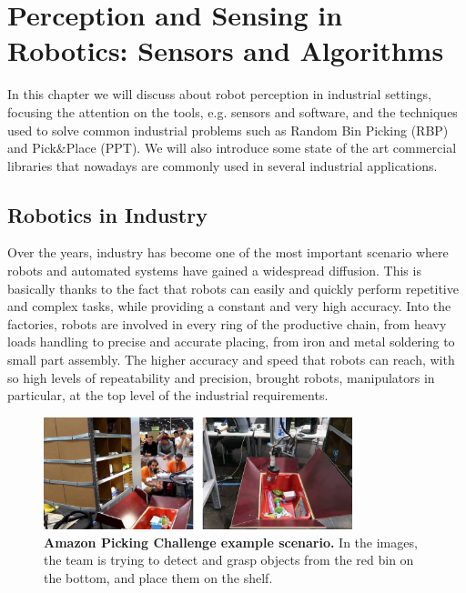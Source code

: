 \chapter{Perception and Sensing in Robotics: Sensors and Algorithms}\label{ch:perceptionandsensing}
In this chapter we will discuss about robot perception in industrial settings, focusing the attention on the tools, e.g. sensors and software, and the techniques used to solve common industrial problems such as Random Bin Picking (RBP) and Pick\&Place (PPT). We will also introduce some state of the art commercial libraries that nowadays are commonly used in several industrial applications.

\section{Robotics in Industry}\label{sec:roboticsinindustry}
Over the years, industry has become one of the most important scenario where robots and automated systems have gained a widespread diffusion. This is basically thanks to the fact that robots can easily and quickly perform repetitive and complex tasks, while providing a constant and very high accuracy.
Into the factories, robots are involved in every ring of the productive chain, from heavy loads handling to precise and accurate placing, from iron and metal soldering to small part assembly. The higher accuracy and speed that robots can reach, with so high levels of repeatability and precision, brought robots, manipulators in particular, at the top level of the industrial requirements.

\begin{figure}
    \centering
    \includegraphics[width=0.8\textwidth]{figures/1_perception_and_sensing_in_robotics/amazon_picking_ch}
    \caption{\textbf{Amazon Picking Challenge example scenario.} In the images, the team is trying to detect and grasp objects from the red bin on the bottom, and place them on the shelf.} 
    \label{fig:amazon_picking_ch}
\end{figure}

